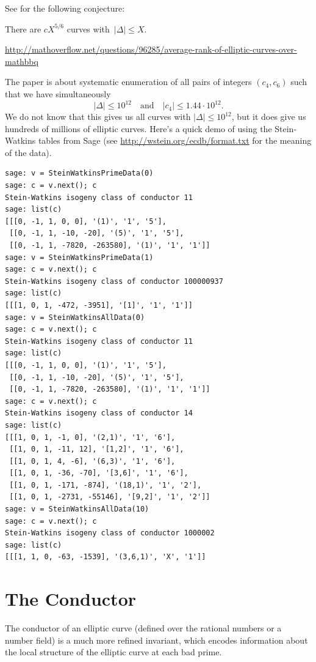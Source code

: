 \documentclass{book}
\begin{document}
See \cite[\S3.4]{bmsw:bulletins} for the following conjecture:
\begin{conjecture}
There are $cX^{5/6}$ curves with~$|\Delta|\le X$.
\end{conjecture}
\url{http://mathoverflow.net/questions/96285/average-rank-of-elliptic-curves-over-mathbbq}



The paper \cite{stein-watkins:ants5} is about systematic
enumeration of all pairs of integers $(c_4,c_6)$ such that
we have simultaneously
$$
|\Delta| \leq 10^{12} \quad\text{and}\quad
|c_4|\leq 1.44\cdot 10^{12}.
$$
We do not know that this gives us all curves with $|\Delta|\leq 10^{12}$,
but it does give us hundreds of millions of elliptic curves.
Here's a quick demo of using the Stein-Watkins tables from Sage
(see \url{http://wstein.org/ecdb/format.txt} for the meaning of the data).
\begin{lstlisting}
sage: v = SteinWatkinsPrimeData(0)
sage: c = v.next(); c
Stein-Watkins isogeny class of conductor 11
sage: list(c)
[[[0, -1, 1, 0, 0], '(1)', '1', '5'],
 [[0, -1, 1, -10, -20], '(5)', '1', '5'],
 [[0, -1, 1, -7820, -263580], '(1)', '1', '1']]
sage: v = SteinWatkinsPrimeData(1)
sage: c = v.next(); c
Stein-Watkins isogeny class of conductor 100000937
sage: list(c)
[[[1, 0, 1, -472, -3951], '[1]', '1', '1']]
sage: v = SteinWatkinsAllData(0)
sage: c = v.next(); c
Stein-Watkins isogeny class of conductor 11
sage: list(c)
[[[0, -1, 1, 0, 0], '(1)', '1', '5'],
 [[0, -1, 1, -10, -20], '(5)', '1', '5'],
 [[0, -1, 1, -7820, -263580], '(1)', '1', '1']]
sage: c = v.next(); c
Stein-Watkins isogeny class of conductor 14
sage: list(c)
[[[1, 0, 1, -1, 0], '(2,1)', '1', '6'],
 [[1, 0, 1, -11, 12], '[1,2]', '1', '6'],
 [[1, 0, 1, 4, -6], '(6,3)', '1', '6'],
 [[1, 0, 1, -36, -70], '[3,6]', '1', '6'],
 [[1, 0, 1, -171, -874], '(18,1)', '1', '2'],
 [[1, 0, 1, -2731, -55146], '[9,2]', '1', '2']]
sage: v = SteinWatkinsAllData(10)
sage: c = v.next(); c
Stein-Watkins isogeny class of conductor 1000002
sage: list(c)
[[[1, 1, 0, -63, -1539], '(3,6,1)', 'X', '1']]
\end{lstlisting}


\newpage
\section{The Conductor}
The conductor of an elliptic curve (defined over the rational numbers
or a number field) is a much more refined
invariant, which encodes information about the local structure
of the elliptic curve at each bad prime.
\end{document}
